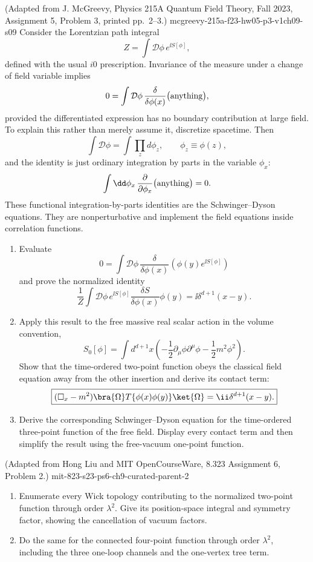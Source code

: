 \begin{enumerate}
  {(Adapted from J. McGreevy, Physics 215A Quantum Field Theory, Fall 2023, Assignment 5, Problem 3, printed pp.~2--3.)}
  {mcgreevy-215a-f23-hw05-p3-v1ch09-s09}
Consider the Lorentzian path integral
\[
 Z=\int\mathcal D\phi\,e^{\ii S[\phi]},
\]
defined with the usual \(i0\) prescription.  Invariance of the measure
under a change of field variable implies
\[
 0=\int\mathcal D\phi\,
 \frac{\delta}{\delta\phi(x)}\bigl(\hbox{anything}\bigr),
\]
provided the differentiated expression has no boundary contribution at
large field.  To explain this rather than merely assume it, discretize
spacetime.  Then
\[
 \int\mathcal D\phi=\int\prod_zd\phi_z,
 \qquad \phi_z\equiv\phi(z),
\]
and the identity is just ordinary integration by parts in the variable
\(\phi_x\):
\[
 \int \dd\phi_x\,\frac{\partial}{\partial\phi_x}
 \bigl(\hbox{anything}\bigr)=0.
\]
These functional integration-by-parts identities are the
Schwinger--Dyson equations.  They are nonperturbative and implement the
field equations inside correlation functions.
\begin{enumerate}
\item
Evaluate
\[
 0=\int\mathcal D\phi\,
 \frac{\delta}{\delta\phi(x)}
 \left(\phi(y)e^{\ii S[\phi]}\right)
\]
and prove the normalized identity
\[
 \boxed{
 \frac1Z\int\mathcal D\phi\,e^{\ii S[\phi]}
 \frac{\delta S}{\delta\phi(x)}\phi(y)
 =\ii\delta^{d+1}(x-y).}
\]
\item
Apply this result to the free massive real scalar action in the volume
convention,
\[
 S_0[\phi]=\int d^{d+1}x\left(
 -\frac12\partial_\mu\phi\partial^\mu\phi
 -\frac12m^2\phi^2\right).
\]
Show that the time-ordered two-point function obeys the classical field
equation away from the other insertion and derive its contact term:
\[
 \boxed{
 (\Box_x-m^2)
 \bra{\Omega}T\{\phi(x)\phi(y)\}\ket{\Omega}
 =\ii\delta^{d+1}(x-y).}
\]
\item
Derive the corresponding Schwinger--Dyson equation for the time-ordered
three-point function of the free field.  Display every contact term and
then simplify the result using the free-vacuum one-point function.
\end{enumerate}

  {(Adapted from Hong Liu and MIT OpenCourseWare, 8.323 Assignment 6, Problem 2.)}
  {mit-823-s23-ps6-ch9-curated-parent-2}
\begin{enumerate}
\item Enumerate every Wick topology contributing to the normalized
two-point function through order \(\lambda^2\).  Give its position-space
integral and symmetry factor, showing the cancellation of vacuum factors.
\item Do the same for the connected four-point function through order
\(\lambda^2\), including the three one-loop channels and the one-vertex
tree term.
\end{enumerate}


\end{enumerate}
